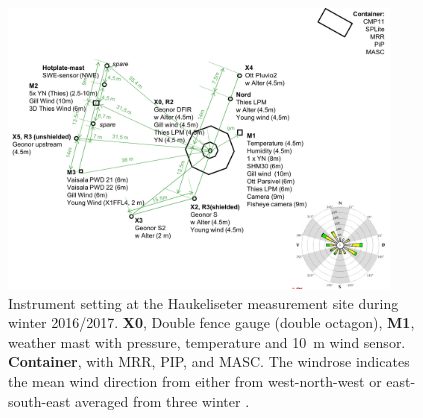 \begin{figure}[t!]
\centering
	\includegraphics[width=0.9\textwidth]{./fig_instruments/instrument_setting.png}
	\caption{Instrument setting at the Haukeliseter measurement site during winter 2016/2017. \textbf{X0}, Double fence gauge (double octagon), \textbf{M1}, weather mast with pressure, temperature and \SI{10}{\metre} wind sensor. \textbf{Container}, with MRR, PIP, and MASC. The windrose indicates the mean wind direction from either from west-north-west or east-south-east averaged from three winter \citep[adapdet from][]{wolff_derivation_2015}. }\label{fig:inst_setting}
\end{figure}
	

